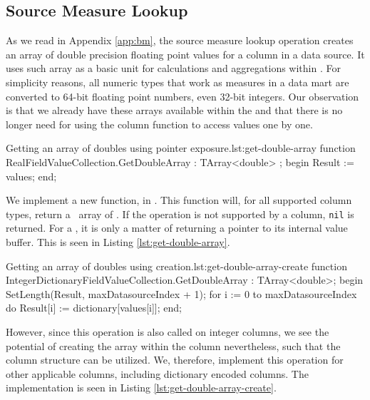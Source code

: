
\subsection{Source Measure Lookup}
\label{sub:Source Measure Lookup}
As we read in Appendix \ref{app:bm}, the source measure lookup operation creates an array of double precision floating point values for a column in a data source. It uses such array as a basic unit for calculations and aggregations within \gd. For simplicity reasons, all numeric types that work as measures in a data mart are converted to 64-bit floating point numbers, even 32-bit integers. Our observation is that we already have these arrays available within the  and that there is no longer need for using the column  function to access values one by one.


\begin{delphicode}{Getting an array of doubles using pointer exposure.}{lst:get-double-array}
function RealFieldValueCollection.GetDoubleArray
: TArray<double> ;
begin
  Result := values;
end;
\end{delphicode}
We implement a new function,  in . This function will, for all supported column types, return a \delphi~array of . If the operation is not supported by a column, \texttt{nil} is returned. For a , it is only a matter of returning a pointer to its internal value buffer.  This is seen in Listing \ref{lst:get-double-array}.
\begin{delphicode}{Getting an array of doubles using creation.}{lst:get-double-array-create}
function IntegerDictionaryFieldValueCollection.GetDoubleArray
: TArray<double>;
begin
  SetLength(Result, maxDatasourceIndex + 1);
  for i := 0 to maxDatasourceIndex do
    Result[i] := dictionary[values[i]];
end;
\end{delphicode}
However, since this operation is also called on integer columns, we see the potential of creating the array within the column nevertheless, such that the column structure can be utilized. We, therefore, implement this operation for other applicable columns, including dictionary encoded columns. The implementation is seen in Listing \ref{lst:get-double-array-create}.

